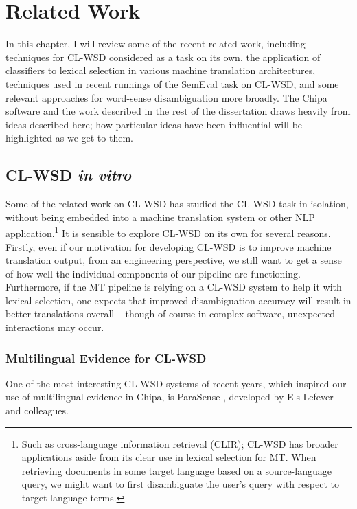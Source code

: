 \chapter{Related Work}
\label{chap:relatedwork}

In this chapter, I will review some of the recent related work, including
techniques for CL-WSD considered as a task on its own, the application of
classifiers to lexical selection in various machine translation architectures,
techniques used in recent runnings of the SemEval task on CL-WSD, and some
relevant approaches for word-sense disambiguation more broadly. The Chipa
software and the work described in the rest of the dissertation draws heavily
from ideas described here; how particular ideas have been influential will be
highlighted as we get to them.

\section{CL-WSD \emph{in vitro}}
Some of the related work on CL-WSD has studied the CL-WSD task in isolation, 
without being embedded into a machine translation system or other NLP
application.\footnote{Such as cross-language information retrieval (CLIR);
CL-WSD has broader applications aside from its clear use in lexical selection
for MT. When retrieving documents in some target language based on a
source-language query, we might want to first disambiguate the user's query
with respect to target-language terms.}
It is sensible to explore CL-WSD on its own for several reasons. Firstly, even
if our motivation for developing CL-WSD is to improve machine translation
output, from an engineering perspective, we still want to get a sense of
how well the individual components of our pipeline are functioning.
Furthermore, if the MT pipeline is relying on a CL-WSD system to help it with
lexical selection, one expects that improved disambiguation accuracy will
result in better translations overall -- though of course in complex software,
unexpected interactions may occur.

\subsection{Multilingual Evidence for CL-WSD}
One of the most interesting CL-WSD systems of recent years, which inspired our
use of multilingual evidence in Chipa, is ParaSense
\cite{lefever-hoste-decock:2011:ACL-HLT2011}, developed by Els Lefever and
colleagues.

